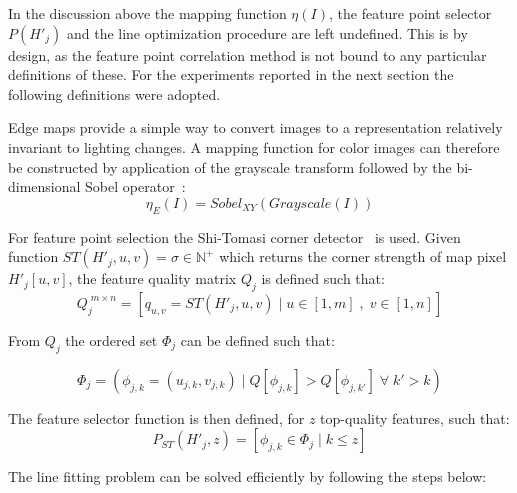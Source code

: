 \documentclass[twocolumn, 9pt,fleqn]{jsproceedings}
\begin{document}
In the discussion above the mapping function $\eta(I)$, the feature point selector $P(H'_j)$ and the line optimization procedure are left undefined. This is by design, as the feature point correlation method is not bound to any particular definitions of these. For the experiments reported in the next section the following definitions were adopted.

Edge maps provide a simple way to convert images to a representation relatively invariant to lighting changes. A mapping function for color images can therefore be constructed by application of the grayscale transform followed by the bi-dimensional Sobel operator~\cite{SOB68}:
\begin{equation}
\eta_E(I) = Sobel_{XY}(Grayscale(I))
\end{equation}

For feature point selection the Shi-Tomasi corner detector~\cite{SHI94} is used. Given function $ST(H'_j, u, v) = \sigma \in \mathbb{N}^{+}$ which returns the corner strength of map pixel $H'_j[u, v]$, the feature quality matrix $Q_j$ is defined such that:
\begin{equation}
Q^{\; m \times n}_j = [q_{u,v} = ST(H'_j, u, v) \; | \; u \in [1, m] \; , \; v \in [1, n]]
\end{equation}

From $Q_j$ the ordered set $\Phi_j$ can be defined such that:

\begin{equation}
\Phi_j = (\phi_{j,k} = (u_{j,k}, v_{j,k}) \; | \; Q[\phi_{j,k}] > Q[\phi_{j,k'}] \; \forall \; k' > k)
\end{equation}

The feature selector function is then defined, for $z$ top-quality features, such that:
\begin{equation}
P_{ST}(H'_j, z) = [\phi_{j,k} \in \Phi_j \; | \; k \leq z]
\end{equation}

The line fitting problem can be solved efficiently by following the steps below:
\end{document}
